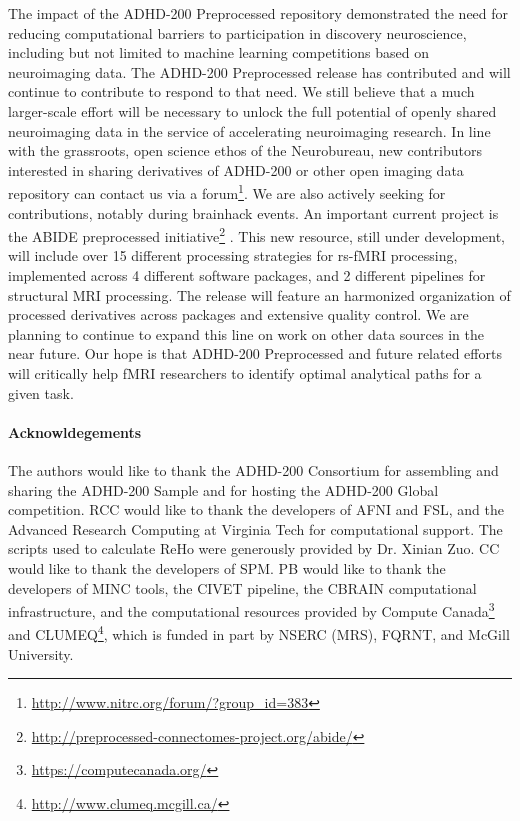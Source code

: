 \documentclass[preprint,12pt,3p]{elsarticle}
\begin{document}
\par
The impact of the ADHD-200 Preprocessed repository demonstrated the need for reducing computational barriers to participation in discovery neuroscience, including but not limited to machine learning competitions based on neuroimaging data. The ADHD-200 Preprocessed release has contributed and will continue to contribute to respond to that need. We still believe that a much larger-scale effort will be necessary to unlock the full potential of openly shared neuroimaging data in the service of accelerating neuroimaging research. In line with the grassroots, open science ethos of the Neurobureau, new contributors interested in sharing derivatives of ADHD-200 or other open imaging data repository can contact us via a forum\footnote{\url{http://www.nitrc.org/forum/?group_id=383}}. We are also actively seeking for contributions, notably during brainhack events\citep{Cameron_Craddock2016-du}. An important current project is the ABIDE preprocessed initiative\footnote{\url{http://preprocessed-connectomes-project.org/abide/}} \citep{dimartino2014}. This new resource, still under development, will include over 15 different processing strategies for rs-fMRI processing, implemented across 4 different software packages, and 2 different pipelines for structural MRI processing. The release will feature an harmonized organization of processed derivatives across packages and extensive quality control. We are planning to continue to expand this line on work on other data sources in the near future. Our hope is that ADHD-200 Preprocessed and future related efforts will critically help fMRI researchers to identify optimal analytical paths for a given task. 

\paragraph{Acknowldegements} The authors would like to thank the ADHD-200 Consortium for assembling and sharing the ADHD-200 Sample and for hosting the ADHD-200 Global competition. RCC would like to thank the developers of AFNI and FSL, and the Advanced Research Computing at Virginia Tech for computational support. The scripts used to calculate ReHo were generously provided by Dr. Xinian Zuo. CC would like to thank the developers of SPM. PB would like to thank the developers of MINC tools, the CIVET pipeline, the CBRAIN computational infrastructure, and the computational resources provided by Compute Canada\footnote{\url{https://computecanada.org/}} and CLUMEQ\footnote{\url{http://www.clumeq.mcgill.ca/}}, which is funded in part by NSERC (MRS), FQRNT, and McGill University.


% 
% 
% 
% 
% 
% 
% 
% 
% 
% 
% 
% 

%

\end{document}
